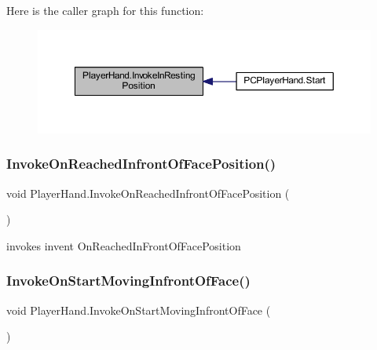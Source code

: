 Here is the caller graph for this function\+:
\nopagebreak
\begin{figure}[H]
\begin{center}
\leavevmode
\includegraphics[width=350pt]{class_player_hand_a886f7afd66af7f0dc59696953aaed4b4_icgraph}
\end{center}
\end{figure}
\mbox{\label{class_player_hand_aa2accfa8b13a70b78b1cd4029cdaaa1e}} 
\subsubsection{\texorpdfstring{Invoke\+On\+Reached\+Infront\+Of\+Face\+Position()}{InvokeOnReachedInfrontOfFacePosition()}}
{\footnotesize\ttfamily void Player\+Hand.\+Invoke\+On\+Reached\+Infront\+Of\+Face\+Position (\begin{DoxyParamCaption}{ }\end{DoxyParamCaption})\hspace{0.3cm}{\ttfamily [protected]}}



invokes invent On\+Reached\+In\+Front\+Of\+Face\+Position 

\mbox{\label{class_player_hand_a1f8cc0ae3bc7e9d3c4d21943eb09852e}} 
\subsubsection{\texorpdfstring{Invoke\+On\+Start\+Moving\+Infront\+Of\+Face()}{InvokeOnStartMovingInfrontOfFace()}}
{\footnotesize\ttfamily void Player\+Hand.\+Invoke\+On\+Start\+Moving\+Infront\+Of\+Face (\begin{DoxyParamCaption}{ }\end{DoxyParamCaption})\hspace{0.3cm}{\ttfamily [protected]}}



